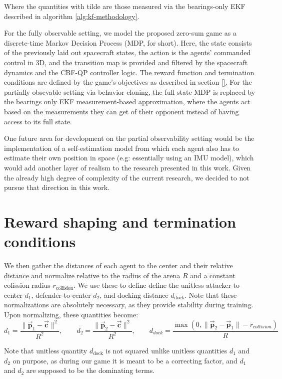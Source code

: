 Where the quantities with tilde are those measured  via the bearings-only EKF described in algorithm \ref{alg:kf-methodology}. 

For the fully observable setting, we model the proposed zero-sum game as a discrete-time Markov Decision Process (MDP, for short). Here, the state consists of the previously laid out spacecraft states, the action is the agents' commanded control in 3D, and the transition map is provided and filtered by the spacecraft dynamics and the CBF-QP controller logic. The reward function and termination conditions are defined by the game's objectives as described in section \ref{}. For the partially obsevable setting via behavior cloning, the full-state MDP is replaced by the bearings only EKF measurement-based approximation, where the agents act based on the measurements they can get of their opponent instead of having access to its full state.


One future area for development on the partial observability setting would be the implementation of a self-estimation model from which each agent also has to estimate their own position in space (e.g: essentially using an IMU model), which would add another layer of realism to the research presented in this work. Given the already high degree of complexity of the current research, we decided to not pursue that direction in this work.



\section{Reward shaping and termination conditions}
\label{sec:Rewards/Termination}

We then gather the distances of each agent to the center and their relative distance and normalize relative to the radius of the arena \(R\) and a constant colission radius $r_{\text{collision}}$. We use these to define define the unitless attacker-to-center $d_1$, defender-to-center $d_2$, and docking distance $d_{\text{dock}}$. Note that these normalizations are absolutely necessary, as they provide stability during training. Upon normalizing, these quantities become:
\[
d_1 = \frac{\|\vec{\mathbf{p}}_1-\vec{\mathbf{c}}\|^2}{R^2},\qquad
d_2 = \frac{\|\vec{\mathbf{p}}_2-\vec{\mathbf{c}}\|^2}{R^2},\qquad
d_{dock} = \frac{\max(0, \|\vec{\mathbf{p}}_2-\vec{\mathbf{p}}_1\| - r_{collision})}{R}
\]



Note that unitless quantity $d_{\text{dock}}$ is not squared unlike unitless quantities $d_1$ and $d_2$ on purpose, as during our game it is meant to be a correcting factor, and $d_1$ and $d_2$ are supposed to be the dominating terms. 

